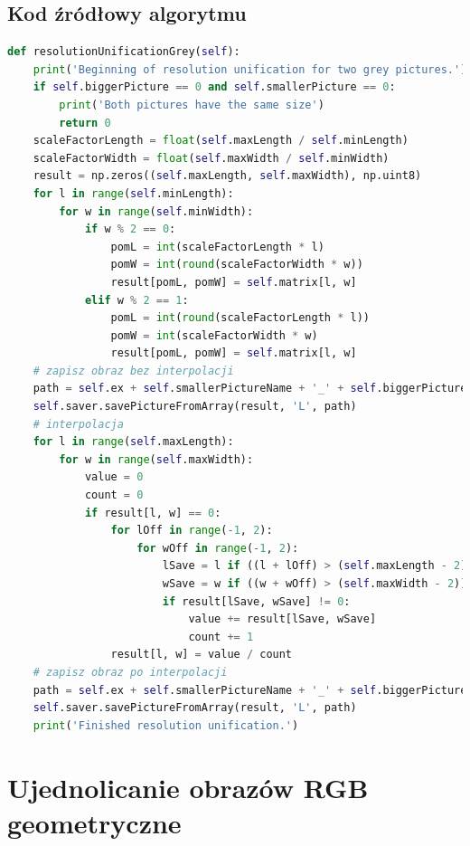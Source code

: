\documentclass[a4paper,12pt, titlepage]{report}
\begin{document}
\subsection*{Kod źródłowy algorytmu}
\begin{lstlisting}[language=Python]
def resolutionUnificationGrey(self):
    print('Beginning of resolution unification for two grey pictures.')
    if self.biggerPicture == 0 and self.smallerPicture == 0:
        print('Both pictures have the same size')
        return 0
    scaleFactorLength = float(self.maxLength / self.minLength)
    scaleFactorWidth = float(self.maxWidth / self.minWidth)
    result = np.zeros((self.maxLength, self.maxWidth), np.uint8)
    for l in range(self.minLength):
        for w in range(self.minWidth):
            if w % 2 == 0:
                pomL = int(scaleFactorLength * l)
                pomW = int(round(scaleFactorWidth * w))
                result[pomL, pomW] = self.matrix[l, w]
            elif w % 2 == 1:
                pomL = int(round(scaleFactorLength * l))
                pomW = int(scaleFactorWidth * w)
                result[pomL, pomW] = self.matrix[l, w]
    # zapisz obraz bez interpolacji
    path = self.ex + self.smallerPictureName + '_' + self.biggerPictureName + '_withoutInterpolation.png'
    self.saver.savePictureFromArray(result, 'L', path)
    # interpolacja
    for l in range(self.maxLength):
        for w in range(self.maxWidth):
            value = 0
            count = 0
            if result[l, w] == 0:
                for lOff in range(-1, 2):
                    for wOff in range(-1, 2):
                        lSave = l if ((l + lOff) > (self.maxLength - 2)) | ((l + lOff) < 0) else (l + lOff)
                        wSave = w if ((w + wOff) > (self.maxWidth - 2)) | ((w + wOff) < 0) else (w + wOff)
                        if result[lSave, wSave] != 0:
                            value += result[lSave, wSave]
                            count += 1
                result[l, w] = value / count
    # zapisz obraz po interpolacji
    path = self.ex + self.smallerPictureName + '_' + self.biggerPictureName + '_withInterpolation.png'
    self.saver.savePictureFromArray(result, 'L', path)
    print('Finished resolution unification.')
\end{lstlisting}

\section{Ujednolicanie obrazów RGB geometryczne}
\end{document}
